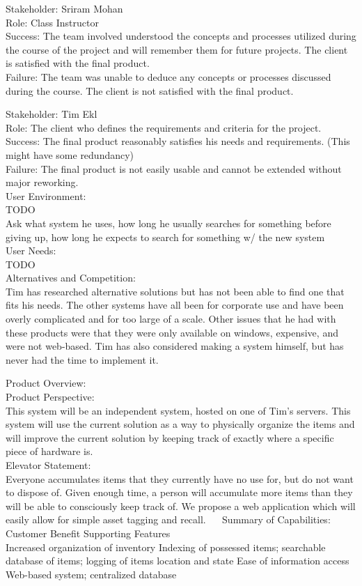 \documentclass{article}
\begin{document}
Stakeholder:  Sriram Mohan\\
Role: Class Instructor\\
Success: The team involved understood the concepts and processes utilized during the course of the project and will remember them for future projects. The client is satisfied with the final product.\\
Failure: The team was unable to deduce any concepts or processes discussed during the course. The client is not satisfied with the final product.

Stakeholder: Tim Ekl\\
Role: The client who defines the requirements and criteria for the project.\\
Success: The final product reasonably satisfies his needs and requirements. (This might have some redundancy)\\
Failure: The final product is not easily usable and cannot be extended without major reworking.\\
User Environment:\\
TODO\\
Ask what system he uses, how long he usually searches for something before giving up, how long he expects to search for something w/ the new system\\
User Needs:\\
TODO\\
Alternatives and Competition:\\
Tim has researched alternative solutions but has not been able to find one that fits his needs.  The other systems have all been for corporate use and have been overly complicated and for too large of a scale.  Other issues that he had with these products were that they were only available on windows, expensive, and were not web-based.  Tim has also considered making a system himself, but has never had the time to implement it.

Product Overview:\\
Product Perspective:\\
This system will be an independent system, hosted on one of Tim’s servers.  This system will use the current solution as a way to physically organize the items and will improve the current solution by keeping track of exactly where a specific piece of hardware is.\\
Elevator Statement:\\
Everyone accumulates items that they currently have no use for, but do not want to dispose of.  Given enough time, a person will accumulate more items than they will be able to consciously keep track of. We propose a web application which will easily allow for simple asset tagging and recall.
 
Summary of Capabilities:\\
Customer Benefit	Supporting Features\\
Increased organization of inventory	Indexing of possessed items; searchable database of items; logging of items location and state 
Ease of information access 	Web-based system; centralized database
	
\end{document}
